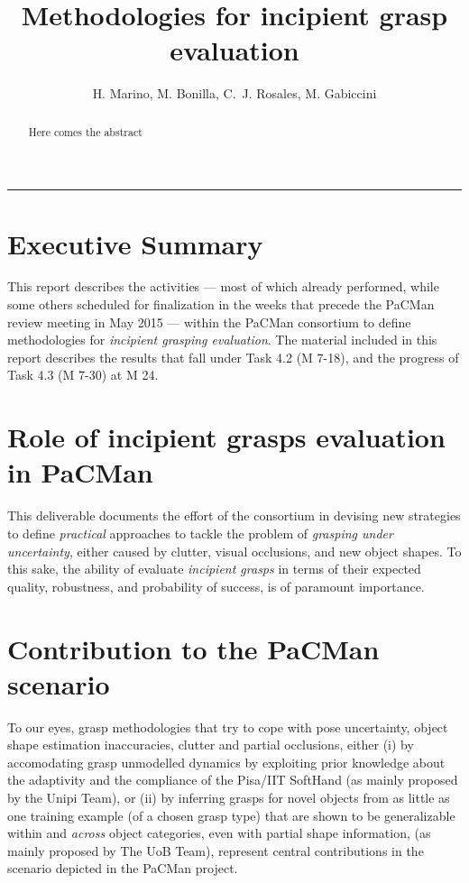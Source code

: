 \documentclass[a4paper,11pt,pdf]{pacmanreport}
\title{Methodologies for incipient grasp evaluation}
\author{H. Marino, M. Bonilla, C.~J. Rosales, M. Gabiccini}
\begin{document}
\maketitle

\begin{abstract}
\noindent Here comes the abstract
\end{abstract}


\vspace{.2em}
\hrule

\footnotesize

\tableofcontents

\normalsize

\newpage

\section*{Executive Summary}

This report describes the activities --- most of which already performed, while some others scheduled for finalization in the weeks that precede the PaCMan review meeting in May 2015 --- within the PaCMan consortium to define methodologies for \emph{incipient grasping evaluation}. The material included in this report describes the results that fall under Task 4.2 (M 7-18), and the progress of Task 4.3 (M 7-30) at M 24.

\section*{Role of incipient grasps evaluation in PaCMan}

This deliverable documents the effort of the consortium in devising new strategies to define \emph{practical} approaches to tackle the problem of \emph{grasping under uncertainty}, either caused by clutter, visual occlusions, and new object shapes. To this sake, the ability of evaluate \emph{incipient grasps} in terms of their expected quality, robustness, and probability of success, is of paramount importance.

\section*{Contribution to the PaCMan scenario}

To our eyes, grasp methodologies that try to cope with pose uncertainty, object shape estimation inaccuracies, clutter and partial occlusions, either (i) by accomodating grasp unmodelled dynamics by exploiting prior knowledge about the adaptivity and the compliance of the Pisa/IIT SoftHand (as mainly proposed by the Unipi Team), or (ii) by inferring grasps for novel objects from as little as one training example (of a chosen grasp type) that are shown to be generalizable within and \emph{across} object categories, even with partial shape information, (as mainly proposed by The UoB Team), represent central contributions in the scenario depicted in the PaCMan project.
\end{document}
